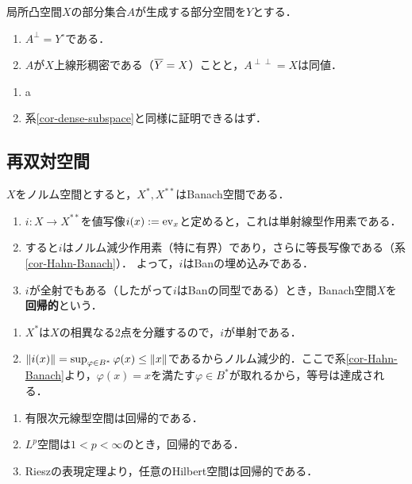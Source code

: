 \documentclass[uplatex,dvipdfmx]{jsreport}
\begin{document}
\begin{proposition}[一般の集合の零化空間]\label{prop-dense-subspace-of-Banach-space}
    局所凸空間$X$の部分集合$A$が生成する部分空間を$Y$とする．
    \begin{enumerate}
        \item $A^\perp=Y^\circ$である．
        \item $A$が$X$上線形稠密である（$\overline{Y}=X$）ことと，$A^{\perp\perp}=X$は同値．
    \end{enumerate}
\end{proposition}
\begin{Proof}\mbox{}
    \begin{enumerate}
        \item a
        \item 系\ref{cor-dense-subspace}と同様に証明できるはず．
    \end{enumerate}
\end{Proof}

\subsection{再双対空間}

\begin{definition}\label{def-bidual}
    $X$をノルム空間とすると，$X^*,X^{**}$はBanach空間である．
    \begin{enumerate}
        \item $i:X\to X^{**}$を値写像$i(x):=\mathrm{ev}_x$と定めると，これは単射線型作用素である．
        \item すると$i$はノルム減少作用素（特に有界）であり，さらに等長写像である（系\ref{cor-Hahn-Banach}）．
        よって，$i$はBanの埋め込みである．
        \item $i$が全射でもある（したがって$i$はBanの同型である）とき，Banach空間$X$を\textbf{回帰的}という．
    \end{enumerate}
\end{definition}
\begin{Proof}\mbox{}
    \begin{enumerate}
        \item $X^*$は$X$の相異なる2点を分離するので，$i$が単射である．
        \item $\|i(x)\|=\sup_{\varphi\in B^*}\varphi(x)\le\|x\|$であるからノルム減少的．ここで系\ref{cor-Hahn-Banach}より，$\varphi(x)=x$を満たす$\varphi\in B^*$が取れるから，等号は達成される．
    \end{enumerate}
\end{Proof}
\begin{example}[回帰的空間の例]\mbox{}
    \begin{enumerate}
        \item 有限次元線型空間は回帰的である．
        \item $L^p$空間は$1<p<\infty$のとき，回帰的である．
        \item Rieszの表現定理より，任意のHilbert空間は回帰的である．
    \end{enumerate}
\end{example}
\end{document}
